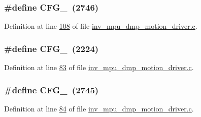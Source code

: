 \subsubsection[{\texorpdfstring{C\+F\+G\+\_\+16}{CFG_16}}]{\setlength{\rightskip}{0pt plus 5cm}\#define C\+F\+G\+\_~(2746)}\hypertarget{group___d_r_i_v_e_r_s_ga7e9d5deadbd595432b6319178d573cd3}{}\label{group___d_r_i_v_e_r_s_ga7e9d5deadbd595432b6319178d573cd3}


Definition at line \hyperlink{inv__mpu__dmp__motion__driver_8c_source_l00108}{108} of file \hyperlink{inv__mpu__dmp__motion__driver_8c_source}{inv\+\_\+mpu\+\_\+dmp\+\_\+motion\+\_\+driver.\+c}.

\subsubsection[{\texorpdfstring{C\+F\+G\+\_\+20}{CFG_20}}]{\setlength{\rightskip}{0pt plus 5cm}\#define C\+F\+G\+\_~(2224)}\hypertarget{group___d_r_i_v_e_r_s_ga12aa4c3bdc65c24ca29ef08e62fd3e13}{}\label{group___d_r_i_v_e_r_s_ga12aa4c3bdc65c24ca29ef08e62fd3e13}


Definition at line \hyperlink{inv__mpu__dmp__motion__driver_8c_source_l00083}{83} of file \hyperlink{inv__mpu__dmp__motion__driver_8c_source}{inv\+\_\+mpu\+\_\+dmp\+\_\+motion\+\_\+driver.\+c}.

\subsubsection[{\texorpdfstring{C\+F\+G\+\_\+23}{CFG_23}}]{\setlength{\rightskip}{0pt plus 5cm}\#define C\+F\+G\+\_~(2745)}\hypertarget{group___d_r_i_v_e_r_s_ga18ca772a0ce432c5ccb0e318af3c2b86}{}\label{group___d_r_i_v_e_r_s_ga18ca772a0ce432c5ccb0e318af3c2b86}


Definition at line \hyperlink{inv__mpu__dmp__motion__driver_8c_source_l00084}{84} of file \hyperlink{inv__mpu__dmp__motion__driver_8c_source}{inv\+\_\+mpu\+\_\+dmp\+\_\+motion\+\_\+driver.\+c}.

